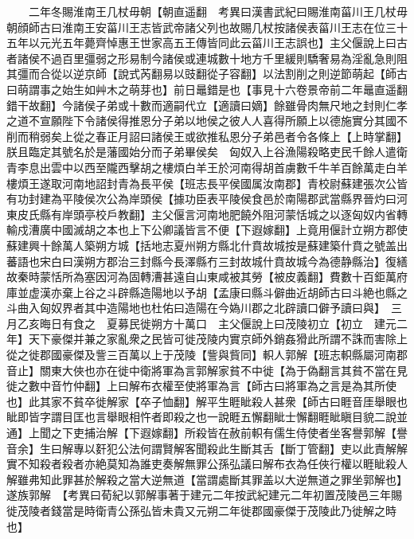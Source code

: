 　　二年冬賜淮南王几杖毋朝【朝直遥翻　考異曰漢書武紀曰賜淮南菑川王几杖毋朝顔師古曰淮南王安菑川王志皆武帝諸父列也故賜几杖按諸侯表菑川王志在位三十五年以元光五年薨齊悼惠王世家高五王傳皆同此云菑川王志誤也】主父偃說上曰古者諸侯不過百里彊弱之形易制今諸侯或連城數十地方千里緩則驕奢易為淫亂急則阻其彊而合從以逆京師【說式芮翻易以豉翻從子容翻】以法割削之則逆節萌起【師古曰萌謂事之始生如艸木之萌芽也】前日鼂錯是也【事見十六卷景帝前二年鼂直遥翻錯干故翻】今諸侯子弟或十數而適嗣代立【適讀曰嫡】餘雖骨肉無尺地之封則仁孝之道不宣願陛下令諸侯得推恩分子弟以地侯之彼人人喜得所願上以德施實分其國不削而稍弱矣上從之春正月詔曰諸侯王或欲推私恩分子弟邑者令各條上【上時掌翻】朕且臨定其號名於是藩國始分而子弟畢侯矣　匈奴入上谷漁陽殺略吏民千餘人遣衛青李息出雲中以西至隴西擊胡之樓煩白羊王於河南得胡首虜數千牛羊百餘萬走白羊樓煩王遂取河南地詔封青為長平侯【班志長平侯國属汝南郡】青校尉蘇建張次公皆有功封建為平陵侯次公為岸頭侯【據功臣表平陵侯食邑於南陽郡武當縣界晉灼曰河東皮氏縣有岸頭亭校戶教翻】主父偃言河南地肥饒外阻河蒙恬城之以逐匈奴内省轉輸戍漕廣中國滅胡之本也上下公卿議皆言不便【下遐嫁翻】上竟用偃計立朔方郡使蘇建興十餘萬人築朔方城【括地志夏州朔方縣北什賁故城按是蘇建築什賁之號盖出蕃語也宋白曰漢朔方郡治三封縣今長澤縣冇三封故城什賁故城今為德静縣治】復繕故秦時蒙恬所為塞因河為固轉漕甚遠自山東咸被其勞【被皮義翻】費數十百鉅萬府庫並虚漢亦棄上谷之斗辟縣造陽地以予胡【孟康曰縣斗僻曲近胡師古曰斗絶也縣之斗曲入匈奴界者其中造陽地也杜佑曰造陽在今媯川郡之北辟讀口僻予讀曰與】　三月乙亥晦日有食之　夏募民徙朔方十萬口　主父偃說上曰茂陵初立【初立　建元二年】天下豪傑并兼之家亂衆之民皆可徙茂陵内實京師外銷姦猾此所謂不誅而害除上從之徙郡國豪傑及訾三百萬以上于茂陵【訾與貲同】軹人郭解【班志軹縣屬河南郡音止】關東大俠也亦在徙中衛將軍為言郭解家貧不中徙【為于偽翻言其貧不當在見徙之數中音竹仲翻】上曰解布衣權至使將軍為言【師古曰將軍為之言是為其所使也】此其家不貧卒徙解家【卒子恤翻】解平生睚眦殺人甚衆【師古曰睚音厓舉眼也眦即皆字謂目匡也言舉眼相忤者即殺之也一說睚五懈翻眦士懈翻睚眦瞋目貌二說並通】上聞之下吏捕治解【下遐嫁翻】所殺皆在赦前軹有儒生侍使者坐客譽郭解【譽音余】生曰解專以姧犯公法何謂賢解客聞殺此生斷其舌【斷丁管翻】吏以此責解解實不知殺者殺者亦絶莫知為誰吏奏解無罪公孫弘議曰解布衣為任俠行權以睚眦殺人解雖弗知此罪甚於解殺之當大逆無道【當謂處斷其罪盖以大逆無道之罪坐郭解也】遂族郭解　【考異曰荀紀以郭解事著于建元二年按武紀建元二年初置茂陵邑三年賜徙茂陵者錢當是時衛青公孫弘皆未貴又元朔二年徙郡國豪傑于茂陵此乃徙解之時也】

